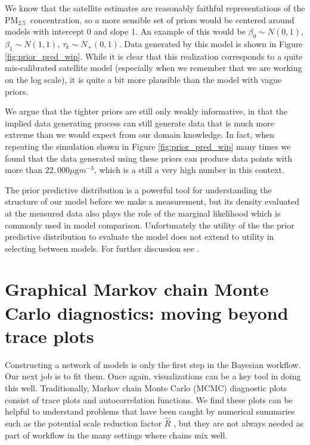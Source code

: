 \documentclass{statsoc}
\newcommand{\PM}{PM$_{2.5}$}
\begin{document}
We know that the satellite estimates are reasonably faithful representations of
the \PM\ concentration, so a more sensible set of priors would be centered
around models with intercept 0 and slope 1.  An example of this would be
$\beta_0 \sim N(0,1)$, $\beta_1 \sim N(1,1)$, $\tau_k \sim N_+(0,1)$. Data
generated by this model is shown in Figure \ref{fig:prior_pred_wip}. While it
is clear that this realization corresponds to a quite mis-calibrated satellite
model (especially when we remember that we are working on the log scale), it is
quite a bit more plausible than the model with vague priors.

We argue that the tighter priors are still only {weakly} informative, in that
the implied data generating process can still generate data that is much more
extreme than we would expect from our domain knowledge.  In fact, when repeating
the simulation shown in Figure \ref{fig:prior_pred_wip} many times we found that
the data generated using these priors can produce data points with more than
$22,\!000 \mu\text{g}m^{-3}$, which is a still a very high number in this
context.

The prior predictive distribution is a powerful tool for understanding the
structure of our model before we make a measurement, but its density evaluated
at the measured data also plays the role of the marginal likelihood which is
commonly used in model comparison.  Unfortunately the utility of the the prior
predictive distribution to evaluate the model does not extend to utility in
selecting between models.  For further discussion see \citet{gelman2017priors}.


\section{Graphical Markov chain Monte Carlo diagnostics: moving beyond trace plots}
\label{sec:mcmc}

Constructing a network of models is only the first step in the Bayesian
workflow. Our next job is to fit them. Once again, visualizations can be a key
tool in doing this well. Traditionally, Markov chain Monte Carlo (MCMC)
diagnostic plots consist of trace plots and autocorrelation functions.  We find
these plots can be helpful to understand problems that have been caught by
numerical summaries such as the potential scale reduction factor $\widehat{R}$
\citep[Section 30.3]{stanmanual}, but they are not always needed as part of
workflow in the many settings where chains mix well.
\end{document}
